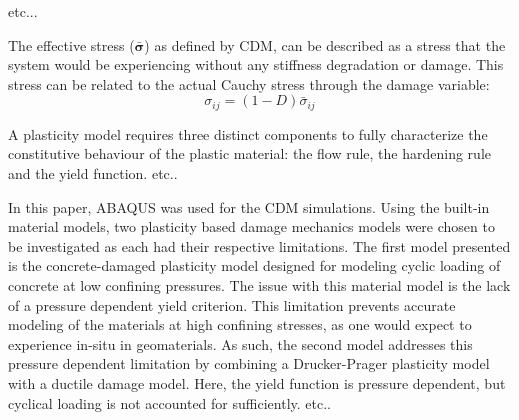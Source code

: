 etc...

The effective stress ($\boldsymbol{\bar{\sigma}}$) as defined by CDM, can be described as a stress that the system would be experiencing without any stiffness degradation or damage. This stress can be related to the actual Cauchy stress through the damage variable: 
\begin{equation}
\sigma_{ij}=\left(1-D\right)\bar{\sigma}_{ij}
\label{eqn:const7}
\end{equation}

A plasticity model requires three distinct components to fully characterize the constitutive behaviour of the plastic material: the flow rule, the hardening rule and the yield function. etc.. 

In this paper, ABAQUS was used for the CDM simulations. Using the built-in material models, two plasticity based damage mechanics models were chosen to be investigated as each had their respective limitations. The first model presented is the concrete-damaged plasticity model designed for modeling cyclic loading of concrete at low confining pressures. The issue with this material model is the lack of a pressure dependent yield criterion. This limitation prevents accurate modeling of the materials at high confining stresses, as one would expect to experience in-situ in geomaterials. As such, the second model addresses this pressure dependent limitation by combining a Drucker-Prager plasticity model with a ductile damage model. Here, the yield function is pressure dependent, but cyclical loading is not accounted for sufficiently. etc..


